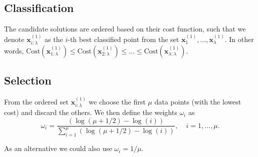\subsection{Classification}
The candidate solutions are ordered based on their cost function, such that we denote $\mathbf{x}^{(1)}_{i:\lambda}$ as the $i$-th best classified point from the set $\mathbf{x}^{(1)}_1,\ldots,\mathbf{x}^{(1)}_\lambda$. In other words, $\mathrm{Cost}(\mathbf{x}_{1:\lambda}^{(1)})\leq \mathrm{Cost}(\mathbf{x}_{2:\lambda}^{(1)})\leq\ldots\leq \mathrm{Cost}(\mathbf{x}_{\lambda:\lambda}^{(1)})$.

\subsection{Selection}
From the ordered set $\mathbf{x}^{(1)}_{i:\lambda}$ we choose the first $\mu$ data points (with the lowest cost) and discard the others.
We then define the weights $\omega_i$ as
\begin{equation}
\omega_i=\frac{\left(\log\left(\mu+1/2\right)-\log(i)\right)}{\sum_{i=1}^\mu\left(\log\left(\mu+1/2\right)-\log(i)\right)}, \ \ \ \ \ i=1,\ldots,\mu.
\end{equation}

As an alternative we could also use $\omega_i=1/\mu$.


